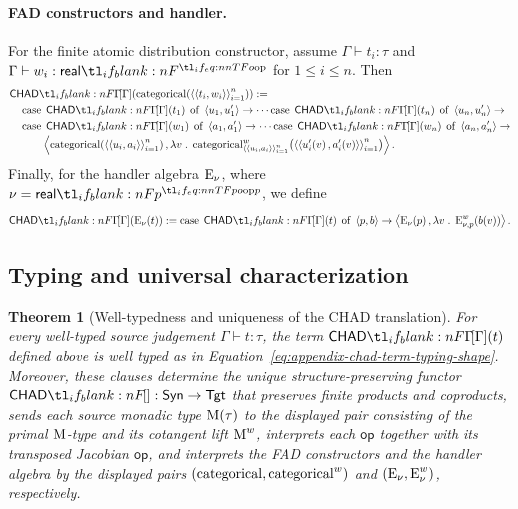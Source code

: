 \documentclass[11pt,a4paper]{article}
\newtheorem{theorem}{Theorem}[section]
\theoremstyle{definition}
\theoremstyle{remark}
\providecommand{\Syn}{\mathsf{Syn}}
\providecommand{\srcop}{\mathsf{op}}
\providecommand{\tgtop}{\mathsf{op}}
\providecommand{\Tgt}{\mathsf{Tgt}}
\begin{document}
\paragraph{FAD constructors and handler.}
For the finite atomic distribution constructor, assume
\(\Gamma\vdash t_{i}:\tau\) and \(\Gamma\vdash w_{i}:\srcreal\) for
\(1\leq i\leq n\).  Then
\begin{align}
  \label{eq:appendix-chad-categorical}
  &\Fun[np]{\chad[\Gamma]}{
    \fn[n]{\opn[b]{categorical}}{\tuple{\tuple{t_{i},w_{i}}}_{i=1}^{n}}
  }
  :=
  \notag\\
  &\quad
  \opn[b]{case}\;\Fun[np]{\chad[\Gamma]}{t_{1}}\;\opn[b]{of}\;\tuple{u_{1},u_{1}'}\to
  \cdots
  \opn[b]{case}\;\Fun[np]{\chad[\Gamma]}{t_{n}}\;\opn[b]{of}\;\tuple{u_{n},u_{n}'}\to
  \notag\\
  &\quad
  \opn[b]{case}\;\Fun[np]{\chad[\Gamma]}{w_{1}}\;\opn[b]{of}\;\tuple{a_{1},a_{1}'}\to
  \cdots
  \opn[b]{case}\;\Fun[np]{\chad[\Gamma]}{w_{n}}\;\opn[b]{of}\;\tuple{a_{n},a_{n}'}\to
  \notag\\[-2pt]
  &\quad\qquad
  \tuple{
    \fn[n]{\opn[b]{categorical}}{\tuple{\tuple{u_{i},a_{i}}}_{i=1}^{n}},
    \lambda v\; .\;
    \fn[n]{
      \opn[b]{categorical}^{w}_{\tuple{\tuple{u_{i},a_{i}}}_{i=1}^{n}}
    }{
      \tuple{\tuple{\fn[n]{u_{i}'}{v},\fn[n]{a_{i}'}{v}}}_{i=1}^{n}
    }
  }.
\end{align}
Finally, for the handler algebra \(\opn[b]{E}_{\nu}\), where
\(\nu=\srcreal[p]\), we define
\begin{equation}
  \label{eq:appendix-chad-handler}
  \Fun[np]{\chad[\Gamma]}{\fn[n]{\opn[b]{E}_{\nu}}{t}}
  :=
  \opn[b]{case}\;\Fun[np]{\chad[\Gamma]}{t}\;\opn[b]{of}\;\tuple{p,b}\to
  \tuple{
    \fn[n]{\opn[b]{E}_{\nu}}{p},
    \lambda v\; .\;
    \fn[n]{\opn[b]{E}^{w}_{\nu,p}}{\fn[n]{b}{v}}
  }.
\end{equation}

\subsection{Typing and universal characterization}

\begin{theorem}[Well-typedness and uniqueness of the CHAD translation]
  \label{th:appendix-chad-well-typedness-uniqueness}
  For every well-typed source judgement \(\Gamma\vdash t:\tau\), the term
  \(\Fun[np]{\chad[\Gamma]}{t}\) defined above is well typed as in
  Equation~\eqref{eq:appendix-chad-term-typing-shape}.  Moreover, these clauses
  determine the unique structure-preserving functor \(\chad:\Syn\to\Tgt\) that
  preserves finite products and coproducts, sends each source monadic
  type \(\Fun[nn]{\opn[b]{M}}{\tau}\) to the displayed pair consisting of the
  primal \(\opn[b]{M}\)-type and its cotangent lift \(\opn[b]{M}^{w}\),
  interprets each \(\srcop\) together with its transposed Jacobian
  \(\tgtop\), and interprets the FAD constructors and the handler algebra by
  the displayed pairs \(\left(\opn[b]{categorical},\opn[b]{categorical}^{w}\right)\)
  and \(\left(\opn[b]{E}_{\nu},\opn[b]{E}^{w}_{\nu}\right)\), respectively.
\end{theorem}
\end{document}
